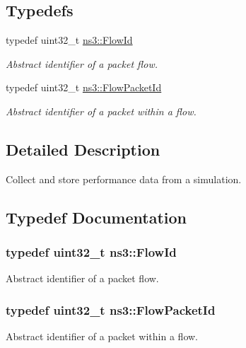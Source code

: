 \subsection*{Typedefs}
\begin{DoxyCompactItemize}
\item 
typedef uint32\+\_\+t \hyperlink{group__flow-monitor_ga39a766c4a370cdb9ab8ac85da4b288e9}{ns3\+::\+Flow\+Id}
\begin{DoxyCompactList}\small\item\em Abstract identifier of a packet flow. \end{DoxyCompactList}\item 
typedef uint32\+\_\+t \hyperlink{group__flow-monitor_gaa1cb18250e1672975204f1254b8aa2ae}{ns3\+::\+Flow\+Packet\+Id}
\begin{DoxyCompactList}\small\item\em Abstract identifier of a packet within a flow. \end{DoxyCompactList}\end{DoxyCompactItemize}


\subsection{Detailed Description}
Collect and store performance data from a simulation. 



\subsection{Typedef Documentation}
\subsubsection[{\texorpdfstring{Flow\+Id}{FlowId}}]{\setlength{\rightskip}{0pt plus 5cm}typedef uint32\+\_\+t {\bf ns3\+::\+Flow\+Id}}\hypertarget{group__flow-monitor_ga39a766c4a370cdb9ab8ac85da4b288e9}{}\label{group__flow-monitor_ga39a766c4a370cdb9ab8ac85da4b288e9}


Abstract identifier of a packet flow. 

\subsubsection[{\texorpdfstring{Flow\+Packet\+Id}{FlowPacketId}}]{\setlength{\rightskip}{0pt plus 5cm}typedef uint32\+\_\+t {\bf ns3\+::\+Flow\+Packet\+Id}}\hypertarget{group__flow-monitor_gaa1cb18250e1672975204f1254b8aa2ae}{}\label{group__flow-monitor_gaa1cb18250e1672975204f1254b8aa2ae}


Abstract identifier of a packet within a flow. 

